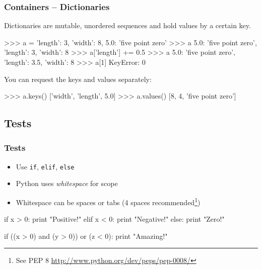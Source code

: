 \documentclass[xetex,10pt]{beamer}
\def\pythoni{\lstinline[language=pythontim]}
\def\spacer{\vspace*{1em}}
\begin{document}
\begin{frame}[fragile]
	\frametitle{Containers -- Dictionaries}

Dictionaries are mutable, unordered sequences and hold values by a certain key.
\begin{python}
>>> a = {'length': 3, 'width': 8, 5.0: 'five point zero'}
>>> a
{5.0: 'five point zero', 'length': 3, 'width': 8}
>>> a['length'] += 0.5
>>> a
{5.0: 'five point zero', 'length': 3.5, 'width': 8}
>>> a[1]
KeyError: 0
\end{python}


	\spacer
	\pause
You can request the keys and values separately:

\begin{python}
>>> a.keys()
['width', 'length', 5.0]
>>> a.values()
[8, 4, 'five point zero']
\end{python}

\end{frame}

\subsection{Tests}

\begin{frame}[fragile]
	\frametitle{Tests}

	\begin{itemize}
	\item Use \pythoni{if}, \pythoni{elif}, \pythoni{else}
	\item Python uses \emph{whitespace} for scope
	\item Whitespace can be spaces or tabs (4 spaces recommended\footnote[frame]{See PEP 8 \url{http://www.python.org/dev/peps/pep-0008/}})
	\end{itemize}
\pause

\begin{python}
if x > 0:
    print "Positive!"
elif x < 0:
    print "Negative!"
else:
    print "Zero!"
\end{python}

	\spacer
\pause

\begin{python}
if ((x > 0) and (y > 0)) or (z < 0):
    print "Amazing!"
\end{python}

\end{frame}
\end{document}
